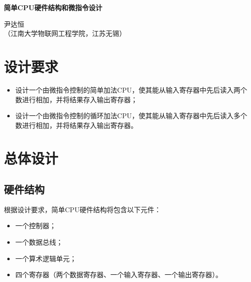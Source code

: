 \documentclass[a4paper]{ctexart}
\begin{document}
\begin{center}
	{\textbf{简单CPU硬件结构和微指令设计}}

	{尹达恒}\\[-1mm]

	{（江南大学物联网工程学院，江苏\quad 无锡）}
\end{center}
\begin{spacing}{1.3}
	\songti{}
	\section{设计要求}
	\begin{itemize}
		\item 设计一个由微指令控制的简单加法CPU，使其能从输入寄存器中先后读入两个数进行相加，并将结果存入输出寄存器；
		\item 设计一个由微指令控制的循环加法CPU，使其能从输入寄存器中先后读入多个数进行相加，并将结果存入输出寄存器。
	\end{itemize}
	\section{总体设计}
	\subsection{硬件结构}
	根据设计要求，简单CPU硬件结构将包含以下元件：
	\begin{itemize}
		\item 一个控制器；
		\item 一个数据总线；
		\item 一个算术逻辑单元；
		\item 四个寄存器（两个数据寄存器、一个输入寄存器、一个输出寄存器）。
	\end{itemize}


\end{spacing}
\end{document}
